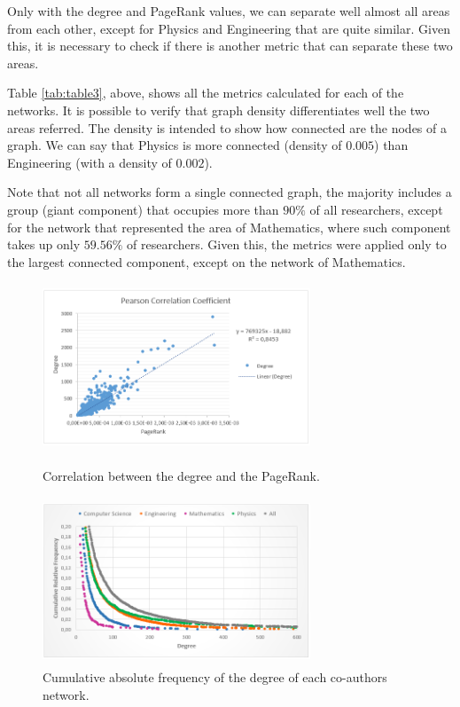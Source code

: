 \documentclass{article}
\begin{document}
\begin{multicols}{2}
Only with the degree and PageRank values, we can separate well almost all areas from each other, except for Physics and Engineering that are quite similar. Given this, it is necessary to check if there is another metric that can separate these two areas.

Table \ref{tab:table3}, above, shows all the metrics calculated for each of the networks. It is possible to verify that graph density differentiates well the two areas referred. The density is intended to show how connected are the nodes of a graph. We can say that Physics is more connected (density of $0.005$) than Engineering (with a density of $0.002$).

Note that not all networks form a single connected graph, the majority includes a group (giant component) that occupies more than $90\%$ of all researchers, except for the network that represented the area of Mathematics, where such component takes up only $59.56\%$ of researchers. Given this, the metrics were applied only to the largest connected component, except on the network of Mathematics.



\begin{figure}[ht]
\begin{minipage}[b]{0.5\linewidth}
\centering
\includegraphics[width=8cm,height=5cm]{Figures/plot1}
\caption{Correlation between the degree and the PageRank.}
\label{fig:figure10}
\end{minipage}
\hspace{0.5cm}
\begin{minipage}[b]{0.5\linewidth}
\centering
\includegraphics[width=8cm,height=5cm]{Figures/plot2}
\caption{Cumulative absolute frequency of the degree of each co-authors network.}
\label{fig:figure11}
\end{minipage}
\end{figure}



\end{multicols}
\end{document}
